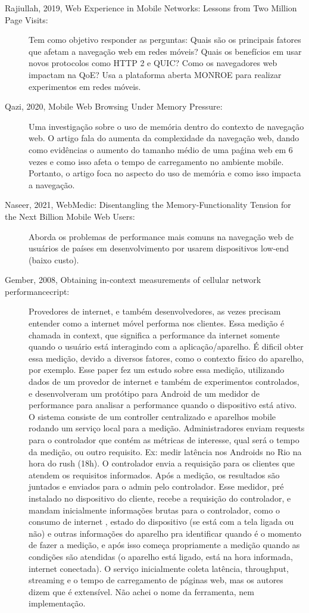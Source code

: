 \documentclass[12pt]{tcc}
\begin{document}
\begin{description}
	\item[Rajiullah, 2019, Web Experience in Mobile Networks: Lessons from Two Million Page Visits:]
	Tem como objetivo responder as perguntas:
	Quais são os principais fatores que afetam a navegação web em redes móveis?
	Quais os benefícios em usar novos protocolos como HTTP 2 e QUIC?
	Como os navegadores web impactam na QoE?
	Usa a plataforma aberta MONROE para realizar experimentos em redes móveis.

	\item[Qazi, 2020, Mobile Web Browsing Under Memory Pressure:]
	Uma investigação sobre o uso de memória dentro do contexto de navegação web. O artigo fala do aumenta da complexidade da navegação web, dando como evidências o aumento do tamanho médio de uma paǵina web em 6 vezes e como isso afeta o tempo de carregamento no ambiente mobile. Portanto, o artigo foca no aspecto do uso de memória e como isso impacta a navegação.

	\item[Naseer, 2021, WebMedic: Disentangling the Memory-Functionality Tension for the Next Billion Mobile Web Users:]
	Aborda os problemas de performance mais comuns na navegação web de usuários de países em desenvolvimento por usarem dispositivos low-end (baixo custo).

	\item[Gember, 2008, Obtaining in-context measurements of cellular network performancecript:]
	Provedores de internet, e também desenvolvedores, as vezes precisam entender como a internet móvel performa nos clientes. Essa medição é chamada in context, que significa a performance da internet somente quando o usuário está interagindo com a aplicação/aparelho. É dificil obter essa medição, devido a diversos fatores, como o contexto físico do aparelho, por exemplo.
	Esse paper fez um estudo sobre essa medição, utilizando dados de um provedor de internet e também de experimentos controlados, e desenvolveram um protótipo para Android de um medidor de performance para analisar a performance quando o dispositivo está ativo.
	O sistema consiste de um controller centralizado e aparelhos mobile rodando um serviço local para a medição. Administradores enviam requests para o controlador que contém as métricas de interesse, qual será o tempo da medição, ou outro requisito. Ex: medir latência nos Androids no Rio na hora do rush (18h). O controlador envia a requisição para os clientes que atendem os requisitos informados. Após a medição, os resultados são juntados e enviados para o admin pelo controlador.
	Esse medidor, pré instalado no dispositivo do cliente, recebe a requisição do controlador, e mandam inicialmente informações brutas para o controlador, como o consumo de internet , estado do dispositivo (se está com a tela ligada ou não) e outras informações do aparelho pra identificar quando é o momento de fazer a medição, e após isso começa propriamente a medição quando as condições são atendidas (o aparelho está ligado, está na hora informada, internet conectada). O serviço inicialmente coleta latência, throughput, streaming e o tempo de carregamento de páginas web, mas os autores dizem que é extensível. Não achei o nome da ferramenta, nem implementação.


\end{description}
\end{document}

